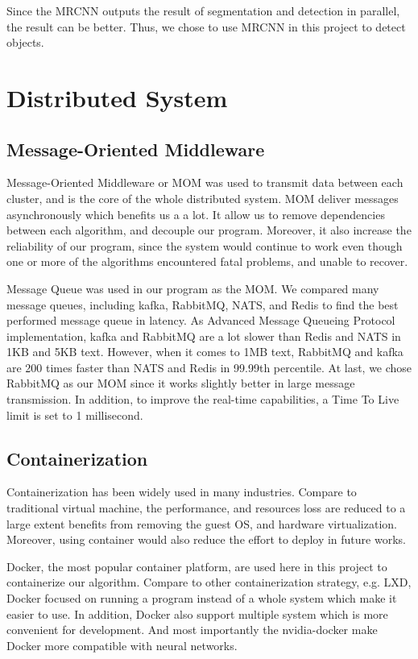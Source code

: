 \documentclass[runningheads]{llncs}
\begin{document}
Since the MRCNN outputs the result of segmentation and 
detection in parallel, the result can be better. Thus, 
we chose to use MRCNN in this project to detect objects.


\section{Distributed System}

\subsection{Message-Oriented Middleware}
Message-Oriented Middleware or MOM was used to transmit 
data between each cluster, and is the core of the whole 
distributed system. MOM deliver messages asynchronously 
which benefits us a a lot. It allow us to remove 
dependencies between each algorithm, and decouple our 
program. Moreover, it also increase the reliability of our 
program, since the system would continue to work even 
though one or more of the algorithms encountered fatal 
problems, and unable to recover.

Message Queue was used in our program as the MOM. We 
compared many message queues, including kafka, RabbitMQ, 
NATS, and Redis to find the best performed message queue 
in latency. As Advanced Message Queueing Protocol 
implementation, kafka and RabbitMQ are a lot slower than 
Redis and NATS in 1KB and 5KB text. However, when it comes
to 1MB text, RabbitMQ and kafka are 200 times faster than 
NATS and Redis in 99.99th percentile. At last, we chose 
RabbitMQ as our MOM since it works slightly better in large 
message transmission. In addition, to improve the real-time 
capabilities, a Time To Live limit is set to 1 millisecond.


\subsection{Containerization}
Containerization has been widely used in many industries. 
Compare to traditional virtual machine, the performance, 
and resources loss are reduced to a large extent benefits 
from removing the guest OS, and hardware virtualization. 
Moreover, using container would also reduce the effort to 
deploy in future works. 

Docker, the most popular container platform, are used here 
in this project to containerize our algorithm. Compare to 
other containerization strategy, e.g. LXD, Docker focused 
on running a program instead of a whole system which make 
it easier to use. In addition, Docker also support multiple 
system which is more convenient for development. And most 
importantly the nvidia-docker make Docker more compatible 
with neural networks.
\end{document}
